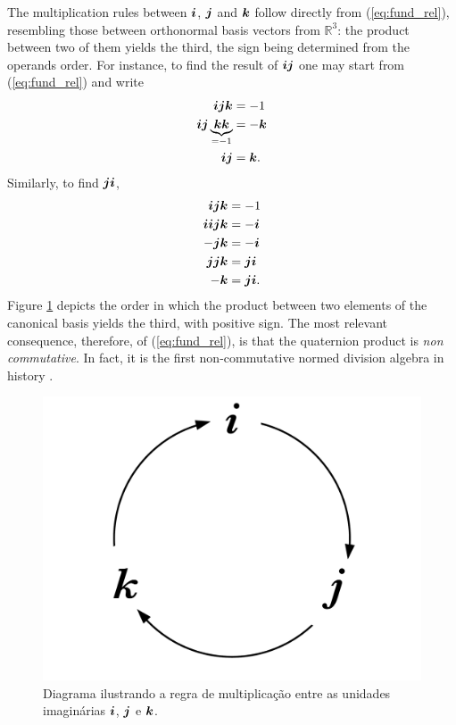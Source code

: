 The multiplication rules between  $ \boldsymbol{i} $, $ \boldsymbol{j} $ and $ \boldsymbol{k} $ follow directly from (\ref{eq:fund_rel}), resembling those between orthonormal basis vectors from $ \mathbb{R}^3 $: the product between two of them yields the third, the sign being determined from the operands order. For instance, to find the result of $ \boldsymbol{i} \boldsymbol{j} $ one may start from (\ref{eq:fund_rel}) and write
\begin{equation}
\begin{aligned}
\boldsymbol{i} \boldsymbol{j} \boldsymbol{k} &= -1 \\
\boldsymbol{i} \boldsymbol{j} \underbrace{\boldsymbol{k} \boldsymbol{k}}_{= -1} &= -\boldsymbol{k} \\
\boldsymbol{i} \boldsymbol{j} &= \boldsymbol{k}.
\end{aligned}
\end{equation}
Similarly, to find $ \boldsymbol{j} \boldsymbol{i} $,
\begin{equation}
\begin{aligned}
\boldsymbol{i} \boldsymbol{j} \boldsymbol{k} &= -1 \\
\boldsymbol{i} \boldsymbol{i} \boldsymbol{j} \boldsymbol{k} &= -\boldsymbol{i} \\
- \boldsymbol{j} \boldsymbol{k} &= - \boldsymbol{i} \\
\boldsymbol{j} \boldsymbol{j} \boldsymbol{k} &=  \boldsymbol{j} \boldsymbol{i} \\
- \boldsymbol{k} &=  \boldsymbol{j} \boldsymbol{i}. \\
\end{aligned}
\end{equation}
Figure \ref{fig:quatmult} depicts the order in which the product between two elements of the canonical basis yields the third, with positive sign. The most relevant consequence, therefore, of (\ref{eq:fund_rel}), is that the quaternion product is \textit{non commutative}. In fact, it is the first non-commutative normed division algebra in history \cite{kleiner2007history}.

\begin{figure}
	\centering
	\includegraphics[width=0.2\linewidth]{Figures/quaternion_multiplication.pdf}
	\caption{Diagrama ilustrando a regra de multiplica\c c\~ao entre as unidades imagin\'arias $ \boldsymbol{i} $, $ \boldsymbol{j} $ e $ \boldsymbol{k} $.}
	\label{fig:quatmult}
\end{figure}



